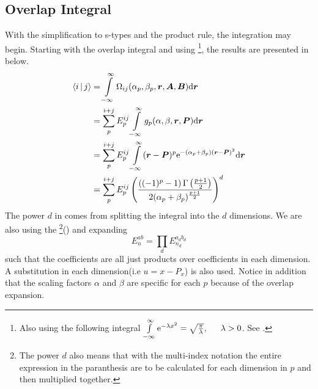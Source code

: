 \subsection{Overlap Integral\label{susec:overlapIntegral}}
    With the simplification to s-types and the product rule, the integration
    may begin. Starting with the overlap integral and using
    \footnote{Also using the following integral $\infint
    \me^{-\lambda x^2} = \sqrt{\frac{\pi}{\lambda}},\indent \lambda>0$. See
    \cite{handbookmath}.}, the results are presented in 
    below.
        \begin{align}
            \Braket{i|j} &= \int\limits^{\infty}_{-\infty}
            \Omega_{ij}(\alpha_p,\beta_p,\boldsymbol{{r}},\boldsymbol{{A}},\boldsymbol{{B}}) \mathrm{d}
            \boldsymbol{{r}} \nonumber \\
            &= \sum\limits^{i+j}_{p} E^{ij}_{p} \int\limits^{\infty}_{-\infty} g_p(\alpha,\beta,\boldsymbol{{r}},\boldsymbol{{P}})
            \mathrm{d}\boldsymbol{{r}} \nonumber \\
            &= \sum\limits^{i+j}_{p} E^{ij}_{p} \int\limits^{\infty}_{-\infty} (\boldsymbol{{r}}-\boldsymbol{{P}})^p \mathrm{e}^{-(\alpha_p +
            \beta_p)(\boldsymbol{{r}} - \boldsymbol{{P}})^2} \mathrm{d}\boldsymbol{{r}} \nonumber \\
            &= \sum\limits^{i+j}_{p} E^{ij}_{p}
            \left(\frac{\left((-1)^p-1\right)\Gamma\left(\frac{p+1}{2}\right)}
            {2(\alpha_p+\beta_p)^{\frac{p+1}{2}}}\right)^d
            \label{eq:stypeOverlap}
        \end{align}
    The power $d$ in  comes from splitting the integral
    into the $d$ dimensions. We are also using the \footnote{The power $d$ also means that with the multi-index
    notation the entire expression in the paranthesis are to be calculated for
    each dimension in $p$ and then multiplied
    together.}() and expanding
        \begin{equation}
            E^{ab}_{n} = \prod_d E^{a_db_d}_{n_d}
            \label{eq:Enotation}
        \end{equation}
    such that the coefficients are all just products over coefficients in each
    dimension. A substitution in each dimension(i.e $u=x-P_x$) is also used.
    Notice in addition that the scaling factors $\alpha$ and $\beta$ are
    specific for each $p$ because of the overlap expansion.


